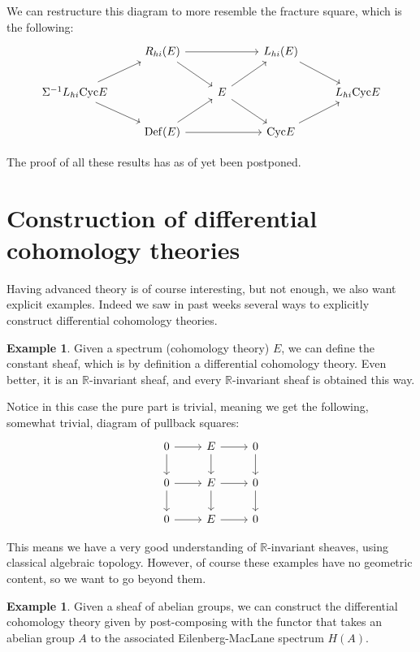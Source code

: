 \documentclass[a4paper]{book}
\newcommand{\bR}{\mathbb{R}}
\theoremstyle{definition}
\newtheorem{example}[equation]{Example}
\theoremstyle{remark}
\numberwithin{equation}{section}
\begin{document}
We can restructure this diagram to more resemble the fracture square, which is the following:
\[
\begin{tikzcd}
 & R_{hi}(E) \arrow[dr] \arrow[rr] & & L_{hi}(E) \arrow[dr] & \\
 \Sigma^{-1}L_{hi}\mathrm{Cyc} E \arrow[ur] \arrow[dr ]& & E \arrow[ur] \arrow[dr] & & L_{hi}\mathrm{Cyc} E \\
  & \mathrm{Def}(E) \arrow[ur] \arrow[rr] & & \mathrm{Cyc} E \arrow[ur] & 
\end{tikzcd}
\]

 The proof of all these results has as of yet been postponed.


\section{Construction of differential cohomology theories}
Having advanced theory is of course interesting, but not enough, we also want explicit examples. Indeed we saw in past weeks several ways to explicitly construct differential cohomology theories.

\begin{example}
  Given a spectrum (cohomology theory) $E$, we can define the constant sheaf, which is by definition a differential cohomology theory. Even better, it is an $\bR$-invariant sheaf, and every $\bR$-invariant sheaf is obtained this way.

  Notice in this case the pure part is trivial, meaning we get the following, somewhat trivial, diagram of pullback squares:
  \[
  \begin{tikzcd}
    0 \arrow[d] \arrow[r] & E \arrow[r] \arrow[d] & 0 \arrow[d] \\ 
     0 \arrow[r] \arrow[d] & E \arrow[r] \arrow[d] & 0 \arrow[d] \\ 
    0 \arrow[r] & E \arrow[r] & 0
  \end{tikzcd}
 \]
\end{example}

This means we have a very good understanding of $\bR$-invariant sheaves, using classical algebraic topology. However, of course these examples have no geometric content, so we want to go beyond them.

\begin{example}
  Given a sheaf of abelian groups, we can construct the differential cohomology theory given by post-composing with the functor that takes an abelian group $A$ to the associated Eilenberg-MacLane spectrum $H(A)$. 
\end{example}
\end{document}
